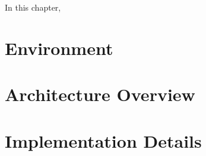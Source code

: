 In this chapter, 

\section{Environment}

\section{Architecture Overview}

\section{Implementation Details}
